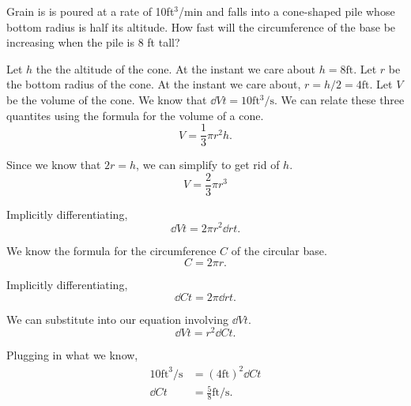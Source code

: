 \begin{example}
	Grain is is poured at a rate of 10ft$^3$/min and falls into a cone-shaped pile whose bottom radius is half its altitude.
	How fast will the circumference of the base be increasing when the pile is 8 ft tall?
\end{example}
\begin{answer}
	Let $h$ the the altitude of the cone.
	At the instant we care about $h=8\text{ft}$.
	Let $r$ be the bottom radius of the cone.
	At the instant we care about, $r=h/2=4\text{ft}$.
	Let $V$ be the volume of the cone.
	We know that $\dd{V}{t}=10\text{ft$^3$/s}$.
	We can relate these three quantites using the formula for the volume of a cone.
	\begin{equation*}
		V = \frac{1}{3}\pi r^2 h.
	\end{equation*}
	
	Since we know that $2r = h$, we can simplify to get rid of $h$.
	\begin{equation*}
		V = \frac{2}{3}\pi r^3
	\end{equation*} 
	
	Implicitly differentiating,
	\begin{equation*}
		\dd{V}{t} = 2\pi r^2 \dd{r}{t}.
	\end{equation*}
	
	We know the formula for the circumference $C$ of the circular base.
	\begin{equation*}
		C = 2\pi r.
	\end{equation*}
	
	Implicitly differentiating,
	\begin{equation*}
		\dd{C}{t} = 2\pi \dd{r}{t}.
	\end{equation*}
	
	We can substitute into our equation involving $\dd{V}{t}$.
	\begin{equation*}
		\dd{V}{t} = r^2\dd{C}{t}.
	\end{equation*}
	
	Plugging in what we know,
	\begin{align*}
		10\text{ft}^3\text{/s} &= (4\text{ft})^2\dd{C}{t} \\
		\dd{C}{t} &= \frac{5}{8}\text{ft/s}.
	\end{align*}
\end{answer}
